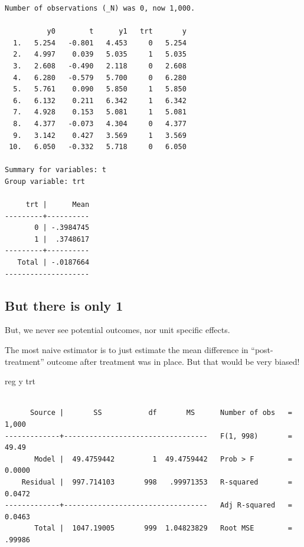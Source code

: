 \documentclass[
  letterpaper,
  DIV=11,
  numbers=noendperiod]{scrartcl}
\newenvironment{Shaded}{\begin{snugshade}}{\end{snugshade}}
\newcommand{\FunctionTok}[1]{\textcolor[rgb]{0.28,0.35,0.67}{#1}}
\newcommand{\KeywordTok}[1]{\textcolor[rgb]{0.00,0.23,0.31}{#1}}
\newcommand{\NormalTok}[1]{\textcolor[rgb]{0.00,0.23,0.31}{#1}}
\begin{document}
\begin{verbatim}
Number of observations (_N) was 0, now 1,000.

          y0        t      y1   trt       y  
  1.   5.254   -0.801   4.453     0   5.254  
  2.   4.997    0.039   5.035     1   5.035  
  3.   2.608   -0.490   2.118     0   2.608  
  4.   6.280   -0.579   5.700     0   6.280  
  5.   5.761    0.090   5.850     1   5.850  
  6.   6.132    0.211   6.342     1   6.342  
  7.   4.928    0.153   5.081     1   5.081  
  8.   4.377   -0.073   4.304     0   4.377  
  9.   3.142    0.427   3.569     1   3.569  
 10.   6.050   -0.332   5.718     0   6.050  

Summary for variables: t
Group variable: trt 

     trt |      Mean
---------+----------
       0 | -.3984745
       1 |  .3748617
---------+----------
   Total | -.0187664
--------------------
\end{verbatim}

\hypertarget{but-there-is-only-1}{%
\subsection{But there is only 1}\label{but-there-is-only-1}}

But, we never see potential outcomes, nor unit specific effects.

The most naive estimator is to just estimate the mean difference in
``post-treatment'' outcome after treatment was in place. But that would
be very biased!

\begin{Shaded}
\begin{Highlighting}[]
\KeywordTok{reg}  \FunctionTok{y}\NormalTok{ trt}
\end{Highlighting}
\end{Shaded}

\begin{verbatim}

      Source |       SS           df       MS      Number of obs   =     1,000
-------------+----------------------------------   F(1, 998)       =     49.49
       Model |  49.4759442         1  49.4759442   Prob > F        =    0.0000
    Residual |  997.714103       998   .99971353   R-squared       =    0.0472
-------------+----------------------------------   Adj R-squared   =    0.0463
       Total |  1047.19005       999  1.04823829   Root MSE        =    .99986
\end{verbatim}
\end{document}

